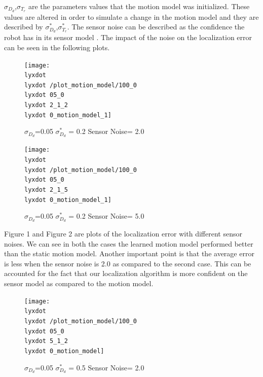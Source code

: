 \documentclass[12pt]{dalcsthesis}
\begin{document}
{$\sigma_{D_{d}}$,$\sigma_{T_{r}}$ are the parameters values that
the motion model was initialized. These values are altered in order
to simulate a change in the motion model and they are described by
$\sigma_{D_{d}}^{*}$,$\sigma_{T_{r}}^{*}$. The sensor noise can
be described as the confidence the robot has in its sensor model .
The impact of the noise on the localization error can be seen in the
following plots.

\begin{figure}
\caption{$\sigma_{D_{d}}$=0.05 $\sigma_{D_{d}}^{*}$ = 0.2 Sensor Noise= 2.0}


\texttt{[image: \\lyxdot \\lyxdot /plot\_motion\_model/100\_0\\lyxdot 05\_0\\lyxdot 2\_1\_2\\lyxdot 0\_motion\_model\_1]}
\end{figure}


\begin{figure}
\caption{$\sigma_{D_{d}}$=0.05 $\sigma_{D_{d}}^{*}$ = 0.2 Sensor Noise= 5.0}


\texttt{[image: \\lyxdot \\lyxdot /plot\_motion\_model/100\_0\\lyxdot 05\_0\\lyxdot 2\_1\_5\\lyxdot 0\_motion\_model\_1]}

\end{figure}


Figure 1 and Figure 2 are plots of the localization error with different
sensor noises. We can see in both the cases the learned motion model
performed better than the static motion model. Another important point
is that the average error is less when the sensor noise is 2.0 as
compared to the second case. This can be accounted for the fact that
our localization algorithm is more confident on the sensor model as
compared to the motion model. 

\begin{figure}
\caption{$\sigma_{D_{d}}$=0.05 $\sigma_{D_{d}}^{*}$ = 0.5 Sensor Noise= 2.0}


\texttt{[image: \\lyxdot \\lyxdot /plot\_motion\_model/100\_0\\lyxdot 05\_0\\lyxdot 5\_1\_2\\lyxdot 0\_motion\_model]}


\end{figure}}
\end{document}
